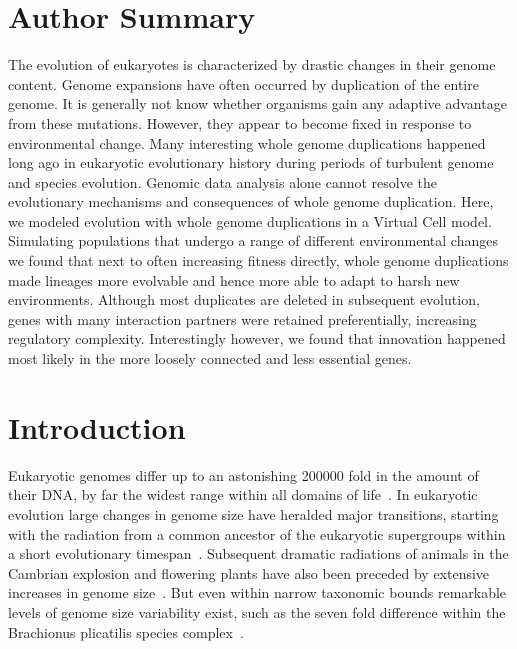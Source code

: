 \section{Author Summary}
The evolution of eukaryotes is characterized by drastic changes in their genome content. Genome expansions have often occurred by duplication of the entire genome. It is generally not know whether organisms gain any adaptive advantage from these mutations. However, they appear to become fixed in response to environmental change. Many interesting whole genome duplications happened long ago in eukaryotic evolutionary history during periods of turbulent genome and species evolution. Genomic data analysis alone cannot resolve the evolutionary mechanisms and consequences of whole genome duplication. Here, we modeled evolution with whole genome duplications in a Virtual Cell model. Simulating populations that undergo a range of different environmental changes we found that next to often increasing fitness directly, whole genome duplications made lineages more evolvable and hence more able to adapt to harsh new environments. Although most duplicates are deleted in subsequent evolution, genes with many interaction partners were retained preferentially, increasing regulatory complexity. Interestingly however, we found that innovation happened most likely in the more loosely connected and less essential genes.

\section{Introduction}
Eukaryotic genomes differ up to an astonishing 200000 fold in the amount of their DNA, by far the widest range within all domains of life~\cite{gregory_coincidence_2001}. In eukaryotic evolution large changes in genome size have heralded major transitions, starting with the radiation from a common ancestor of the eukaryotic supergroups within a short evolutionary timespan~\cite{ouzounis_minimal_2005,koonin_origin_2010}. Subsequent dramatic radiations of animals in the Cambrian explosion and flowering plants have also been preceded by extensive increases in genome size~\cite{zmasek_strong_2011,jiao_genome_2012}. But even within narrow taxonomic bounds remarkable levels of genome size variability exist, such as the seven fold difference within the Brachionus plicatilis species complex~\cite{stelzer_genome_2011}.


